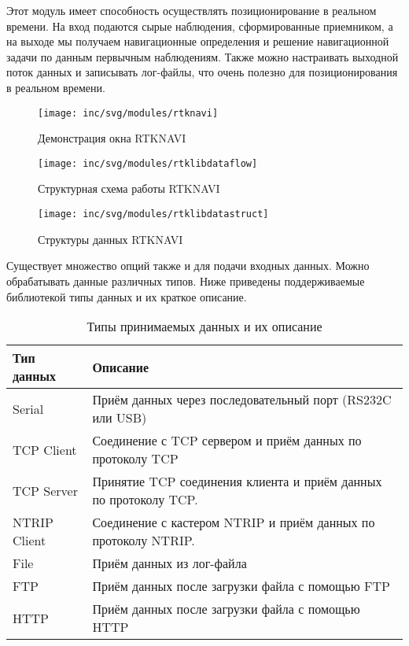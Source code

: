 Этот модуль имеет способность осуществлять позиционирование в реальном времени. На вход подаются сырые наблюдения, сформированные приемником, а на выходе мы получаем навигационные определения и решение навигационной задачи по данным первычным наблюдениям. Также можно настраивать выходной поток данных и записывать лог-файлы, что очень полезно для позиционирования в реальном времени.


\begin{figure}[h!]
	\centering
	\texttt{[image: inc/svg/modules/rtknavi]}
	\caption{Демонстрация окна RTKNAVI}
	\label{fig:rtknavi}
\end{figure}
\begin{figure}[h!]
	\centering
	\texttt{[image: inc/svg/modules/rtklibdataflow]}
	\caption{Структурная схема работы RTKNAVI}
	\label{fig:rtklibdataflow}
\end{figure}
\begin{figure}[h!]
	\centering
	\texttt{[image: inc/svg/modules/rtklibdatastruct]}
	\caption{Структуры данных RTKNAVI}
	\label{fig:rtklibdatastruct}
\end{figure}

Существует множество опций также и для подачи входных данных. Можно обрабатывать данные различных типов. Ниже приведены поддерживаемые библиотекой типы данных и их краткое описание.
\begin{longtable}{|p{4cm}|p{12cm}|}
	\caption{Типы принимаемых данных и их описание} \label{tab:types}\\
	\hline
	Тип данных & Описание \\
	\hline
	Serial & Приём данных через последовательный порт (RS232C или USB) \\
	\hline
	TCP Client & Соединение с TCP сервером и приём данных по протоколу TCP \\
	\hline
	TCP Server & Принятие TCP соединения клиента и приём данных по протоколу TCP. \\
	\hline
	NTRIP Client & Соединение с кастером NTRIP и приём данных по протоколу NTRIP. \\
	\hline
	File & Приём данных из лог-файла \\
	\hline
	FTP & Приём данных после загрузки файла с помощью FTP \\
	\hline
	HTTP & Приём данных после загрузки файла с помощью HTTP \\
	\hline
\end{longtable}
\FloatBarrier

